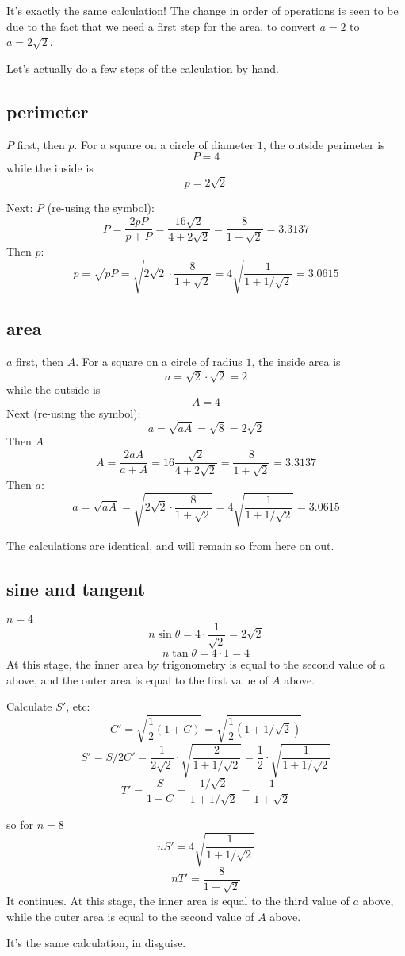 \documentclass[11pt, oneside]{article}
\begin{document}
It's exactly the same calculation!  The change in order of operations is seen to be due to the fact that we need a first step for the area, to convert $a = 2$ to $a = 2 \sqrt{2}$.

Let's actually do a few steps of the calculation by hand.

\subsection*{perimeter}
$P$ first, then $p$.  For a square on a circle of diameter $1$, the outside perimeter is
\[ P = 4 \]
while the inside is
\[ p = 2 \sqrt{2} \]

Next:  $P$ (re-using the symbol):
\[ P = \frac{2pP}{p+P} = \frac{16 \sqrt{2}}{4 + 2 \sqrt{2}} = \frac{8}{1 + \sqrt{2}} = 3.3137 \]
Then $p$:
\[ p = \sqrt{pP} = \sqrt{2 \sqrt{2} \cdot \frac{8}{1 + \sqrt{2}}} = 4 \sqrt{\frac{1}{1 +1/ \sqrt{2}}} = 3.0615  \]

\subsection*{area}
$a$ first, then $A$.  For a square on a circle of radius $1$, the inside area is
\[ a = \sqrt{2} \cdot \sqrt{2} = 2 \]
while the outside is 
\[ A = 4 \]
Next (re-using the symbol):
\[ a = \sqrt{aA} = \sqrt{8} = 2 \sqrt{2} \]
Then $A$
\[ A = \frac{2aA}{a + A} = 16 \frac{\sqrt{2} }{4 + 2 \sqrt{2}} = \frac{8}{1 + \sqrt{2}} = 3.3137 \]
Then $a$:
\[ a = \sqrt{aA} = \sqrt{2 \sqrt{2} \cdot \frac{8}{1 + \sqrt{2}}} = 4 \sqrt{\frac{1}{1 +1/ \sqrt{2}}} = 3.0615  \]

The calculations are identical, and will remain so from here on out.

\subsection*{sine and tangent}
$n=4$
\[ n \sin \theta = 4 \cdot \frac{1}{\sqrt{2}} = 2 \sqrt{2} \]
\[ n \tan \theta = 4 \cdot 1 = 4 \]
At this stage, the inner area by trigonometry is equal to the second value of $a$ above, and the outer area is equal to the first value of $A$ above.

Calculate $S'$, etc:
\[ C' = \sqrt{\frac{1}{2} (1 + C)} = \sqrt{\frac{1}{2} (1 + 1/\sqrt{2}) } \]
\[ S' = S/2C' = \frac{1}{2 \sqrt{2}} \cdot \sqrt{\frac{2}{1 + 1/\sqrt{2}}} = \frac{1}{2} \cdot \sqrt{\frac{1}{1 + 1/\sqrt{2}}} \]
\[ T' = \frac{S}{1 + C} = \frac{1/\sqrt{2}}{1 + 1/\sqrt{2}} = \frac{1}{1 + \sqrt{2}} \]

so for $n=8$
\[ n S' = 4 \sqrt{\frac{1}{1 + 1/\sqrt{2}}} \]
\[ n T' = \frac{8}{1 + \sqrt{2}} \]
It continues.  At this stage, the inner area is equal to the third value of $a$ above, while the outer area is equal to the second value of $A$ above.

It's the same calculation, in disguise.
\end{document}

